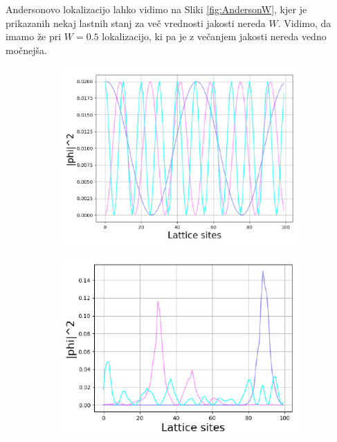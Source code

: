 Andersonovo lokalizacijo lahko vidimo na Sliki \ref{fig:AndersonW}, kjer je prikazanih nekaj lastnih stanj za več vrednosti jakosti nereda $W$. Vidimo, da imamo že pri $W=0.5$ lokalizacijo, ki pa je z večanjem jakosti nereda vedno močnejša.
\begin{figure}[H]
\centering
\begin{subfigure}{.33\textwidth}
\includegraphics[width=\linewidth]{Figures/AndersonBloch.pdf}
\end{subfigure}
\begin{subfigure}{.32\textwidth}
\includegraphics[width=\linewidth]{Figures/Anderson05.pdf}
\end{subfigure}
\begin{subfigure}{.33\textwidth}

\end{subfigure}
\end{figure}
